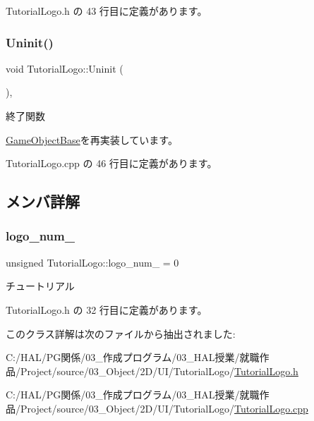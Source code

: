 Tutorial\+Logo.\+h の 43 行目に定義があります。

\mbox{\label{class_tutorial_logo_a8e1f1dba47dadf7d1bb40f616324ffb5}} 
\subsubsection{\texorpdfstring{Uninit()}{Uninit()}}
{\footnotesize\ttfamily void Tutorial\+Logo\+::\+Uninit (\begin{DoxyParamCaption}{ }\end{DoxyParamCaption})\hspace{0.3cm}{\ttfamily [override]}, {\ttfamily [virtual]}}



終了関数 



\mbox{\hyperlink{class_game_object_base_a97e1bc277d7b1c0156d4735de29a022c}{Game\+Object\+Base}}を再実装しています。



 Tutorial\+Logo.\+cpp の 46 行目に定義があります。



\subsection{メンバ詳解}
\mbox{\label{class_tutorial_logo_a8027b42e33a036e88277c4cd17fabdaa}} 
\subsubsection{\texorpdfstring{logo\+\_\+num\+\_\+}{logo\_num\_}}
{\footnotesize\ttfamily unsigned Tutorial\+Logo\+::logo\+\_\+num\+\_\+ = 0\hspace{0.3cm}{\ttfamily [private]}}



チュートリアル 



 Tutorial\+Logo.\+h の 32 行目に定義があります。



このクラス詳解は次のファイルから抽出されました\+:\begin{DoxyCompactItemize}
\item 
C\+:/\+H\+A\+L/\+P\+G関係/03\+\_\+作成プログラム/03\+\_\+\+H\+A\+L授業/就職作品/\+Project/source/03\+\_\+\+Object/2\+D/\+U\+I/\+Tutorial\+Logo/\mbox{\hyperlink{_tutorial_logo_8h}{Tutorial\+Logo.\+h}}\item 
C\+:/\+H\+A\+L/\+P\+G関係/03\+\_\+作成プログラム/03\+\_\+\+H\+A\+L授業/就職作品/\+Project/source/03\+\_\+\+Object/2\+D/\+U\+I/\+Tutorial\+Logo/\mbox{\hyperlink{_tutorial_logo_8cpp}{Tutorial\+Logo.\+cpp}}\end{DoxyCompactItemize}
